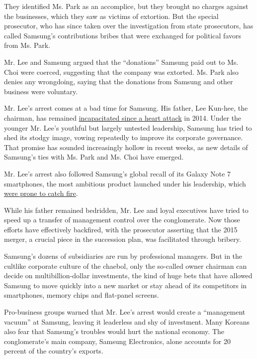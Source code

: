 They identified Ms. Park as an accomplice, but they brought no charges
against the businesses, which they saw as victims of extortion. But the
special prosecutor, who has since taken over the investigation from
state prosecutors, has called Samsung's contributions bribes that were
exchanged for political favors from Ms. Park.

Mr. Lee and Samsung argued that the ``donations'' Samsung paid out to
Ms. Choi were coerced, suggesting that the company was extorted. Ms.
Park also denies any wrongdoing, saying that the donations from Samsung
and other business were voluntary.

Mr. Lee's arrest comes at a bad time for Samsung. His father, Lee
Kun-hee, the chairman, has remained
\href{https://www.nytimes.com/2014/05/12/business/international/samsungs-chairman-has-surgery-after-heart-attack.html}{incapacitated
since a heart attack} in 2014. Under the younger Mr. Lee's youthful but
largely untested leadership, Samsung has tried to shed its stodgy image,
vowing repeatedly to improve its corporate governance. That promise has
sounded increasingly hollow in recent weeks, as new details of Samsung's
ties with Ms. Park and Ms. Choi have emerged.

Mr. Lee's arrest also followed Samsung's global recall of its Galaxy
Note 7 smartphones, the most ambitious product launched under his
leadership, which
\href{https://www.nytimes.com/2016/09/03/business/samsung-galaxy-note-battery.html}{were
prone to catch fire}.

While his father remained bedridden, Mr. Lee and loyal executives have
tried to speed up a transfer of management control over the
conglomerate. Now those efforts have effectively backfired, with the
prosecutor asserting that the 2015 merger, a crucial piece in the
succession plan, was facilitated through bribery.

Samsung's dozens of subsidiaries are run by professional managers. But
in the cultlike corporate culture of the chaebol, only the so-called
owner chairman can decide on multibillion-dollar investments, the kind
of huge bets that have allowed Samsung to move quickly into a new market
or stay ahead of its competitors in smartphones, memory chips and
flat-panel screens.

Pro-business groups warned that Mr. Lee's arrest would create a
``management vacuum'' at Samsung, leaving it leaderless and shy of
investment. Many Koreans also fear that Samsung's troubles would hurt
the national economy. The conglomerate's main company, Samsung
Electronics, alone accounts for 20 percent of the country's exports.


